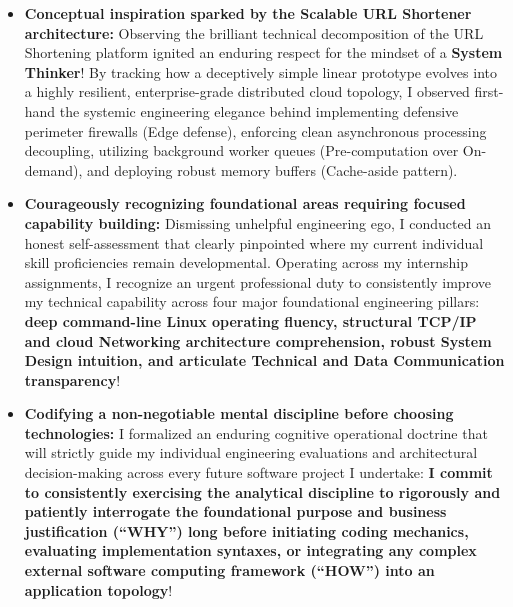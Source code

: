 \begin{itemize}
  academic ambition of simply completing isolated daily tutorial labs to
  secure passing scores. Learning about the supportive, collaborative
  frameworks driving the \textbf{AWS Student Builder Group, AWS
  Community Builder ecosystem, and international AWS Partner network}
  illuminated an inspiring, \textbf{highly methodical long-term career
  advancement journey defined by authentic engineering substance,
  personal humility, and continuous technical knowledge sharing}.
  Simultaneously, I established mature realism regarding industry
  opportunities: participating within collaborative student builder
  clubs or mentorship organizations does not provide an automatic
  employment guarantee; long-term professional success remains entirely
  dependent upon an individual's verified technical competence,
  unshakeable debugging grit, and personal execution value demonstrated
  across competitive corporate work environments!
\item
  \textbf{Conceptual inspiration sparked by the Scalable URL Shortener
  architecture:} Observing the brilliant technical decomposition of the
  URL Shortening platform ignited an enduring respect for the mindset of
  a \textbf{System Thinker}! By tracking how a deceptively simple linear
  prototype evolves into a highly resilient, enterprise-grade
  distributed cloud topology, I observed first-hand the systemic
  engineering elegance behind implementing defensive perimeter firewalls
  (Edge defense), enforcing clean asynchronous processing decoupling,
  utilizing background worker queues (Pre-computation over On-demand),
  and deploying robust memory buffers (Cache-aside pattern).
\item
  \textbf{Courageously recognizing foundational areas requiring focused
  capability building:} Dismissing unhelpful engineering ego, I
  conducted an honest self-assessment that clearly pinpointed where my
  current individual skill proficiencies remain developmental. Operating
  across my internship assignments, I recognize an urgent professional
  duty to consistently improve my technical capability across four major
  foundational engineering pillars: \textbf{deep command-line Linux
  operating fluency, structural TCP/IP and cloud Networking architecture
  comprehension, robust System Design intuition, and articulate
  Technical and Data Communication transparency}!
\item
  \textbf{Codifying a non-negotiable mental discipline before choosing
  technologies:} I formalized an enduring cognitive operational doctrine
  that will strictly guide my individual engineering evaluations and
  architectural decision-making across every future software project I
  undertake: \textbf{I commit to consistently exercising the analytical
  discipline to rigorously and patiently interrogate the foundational
  purpose and business justification (``WHY'') long before initiating
  coding mechanics, evaluating implementation syntaxes, or integrating
  any complex external software computing framework (``HOW'') into an
  application topology}!
\end{itemize}

